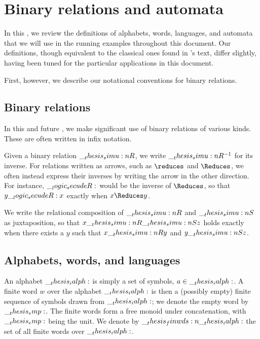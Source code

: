 \chapter{Binary relations and automata}\label{ch:automata}\label{ch:finite-automata}

In this , we review the definitions of alphabets, words, languages, and automata that we will use in the running examples throughout this document.
Our definitions, though equivalent to the classical ones found in \citeauthor{Hopcroft+:06}'s text\autocite{Hopcroft+:06}, differ slightly, having been tuned for the particular applications in this document.

First, however, we describe our notational conventions for binary relations.

\section{Binary relations}

In this and future , we make significant use of binary relations of various kinds.
These are often written in infix notation.

Given a binary relation $\__thesis_simu:n {R}$, we write $\__thesis_simu:n {R}^{-1}$ for its inverse.
For relations written as arrows, such as $\reduces$ and $\Reduces$, we often instead express their inverses by writing the arrow in the other direction.
For instance, $\__logic_secudeR:$ would be the inverse of $\Reduces$, so that $y \__logic_secudeR: x$ exactly when $x \Reduces y$.

We write the relational composition of $\__thesis_simu:n {R}$ and $\__thesis_simu:n {S}$ as juxtaposition, so that $x \__thesis_simu:n {R}\__thesis_simu:n {S} z$ holds exactly when there exists a $y$ such that $x \__thesis_simu:n {R} y$ and $y \__thesis_simu:n {S} z$.

\section{Alphabets, words, and languages}

An alphabet $\__thesis_ialph:$ is simply a set of symbols, $a \in \__thesis_ialph:$.
A finite word $w$ over the alphabet $\__thesis_ialph:$ is then a (possibly empty) finite sequence of symbols drawn from $\__thesis_ialph:$;
we denote the empty word by $\__thesis_emp:$.
The finite words form a free monoid under concatenation, with $\__thesis_emp:$ being the unit.
We denote by $\__thesis_finwds:n {\__thesis_ialph:}$ the set of all finite words over $\__thesis_ialph:$.

